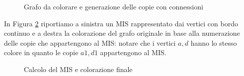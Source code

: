 \documentclass{article}
\begin{document}
\begin{figure}
\caption{Grafo da colorare e generazione delle copie con connessioni}
\label{figura:original-graph-and-reduce-ready-graph}
\end{figure}

In Figura \ref{figura:MIS-coloring} riportiamo a sinistra un MIS
rappresentato dai vertici con bordo continuo e a destra la colorazione 
del grafo originale in base alla numerazione delle copie che appartengono
al MIS: notare che i vertici $a,d$ hanno lo stesso colore in quanto le copie
$a1, d1$ appartengono al MIS.
\begin{figure}
\caption{Calcolo del MIS e colorazione finale}
\label{figura:MIS-coloring}
\end{figure}
\end{document}
